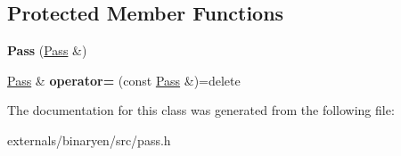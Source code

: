 \subsection*{Protected Member Functions}
\begin{DoxyCompactItemize}
\item 
\mbox{\label{classwasm_1_1_pass_a8372d51885ff26de2c2a5f8f75430c81}} 
{\bfseries Pass} (\mbox{\hyperlink{classwasm_1_1_pass}{Pass}} \&)
\item 
\mbox{\label{classwasm_1_1_pass_a84cd4a6aef40050ea13c6dea3bc89a29}} 
\mbox{\hyperlink{classwasm_1_1_pass}{Pass}} \& {\bfseries operator=} (const \mbox{\hyperlink{classwasm_1_1_pass}{Pass}} \&)=delete
\end{DoxyCompactItemize}


The documentation for this class was generated from the following file\+:\begin{DoxyCompactItemize}
\item 
externals/binaryen/src/pass.\+h\end{DoxyCompactItemize}
